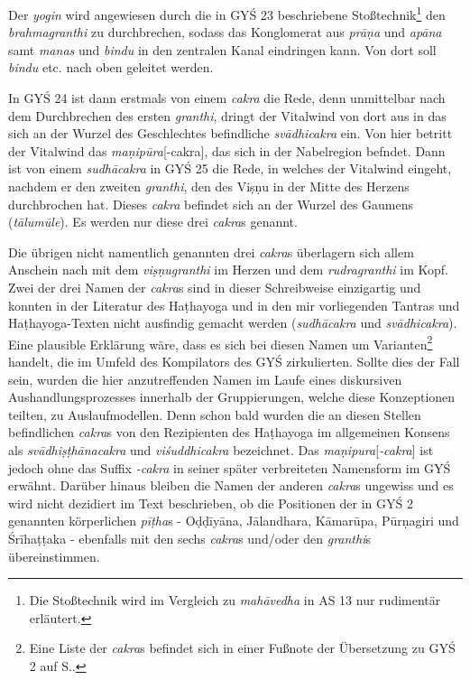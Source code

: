 \documentclass[a4paper,12pt]{article}
\begin{document}
Der \textit{yogin} wird angewiesen durch die in GYŚ 23 beschriebene Stoßtechnik\footnote{Die Stoßtechnik wird im Vergleich zu \textit{mahāvedha} in AS 13 nur rudimentär erläutert.} den \textit{brahmagranthi} zu durchbrechen, sodass das Konglomerat aus \textit{prāṇa} und \textit{apāna} samt \textit{manas} und \textit{bindu} in den zentralen Kanal eindringen kann. Von dort soll \textit{bindu} etc. nach oben geleitet werden.

In GYŚ 24 ist dann erstmals von einem \textit{cakra} die Rede, denn unmittelbar nach dem Durchbrechen des ersten \textit{granthi}, dringt der Vitalwind von dort aus in das sich an der Wurzel des Geschlechtes befindliche \textit{svādhicakra} ein. Von hier betritt der Vitalwind das \textit{maṇipūra}[-cakra], das sich in der Nabelregion befndet. Dann ist von einem \textit{sudhācakra} in GYŚ 25 die Rede, in welches der Vitalwind eingeht, nachdem er den zweiten \textit{granthi}, den des Viṣṇu in der Mitte des Herzens durchbrochen hat. Dieses \textit{cakra} befindet sich an der Wurzel des Gaumens (\textit{tālumūle}). Es werden nur diese drei \textit{cakra}s genannt.

Die übrigen nicht namentlich genannten drei \textit{cakra}s überlagern sich allem Anschein nach mit dem \textit{viṣṇugranthi} im Herzen und dem \textit{rudragranthi} im Kopf. Zwei der drei Namen der \textit{cakra}s sind in dieser Schreibweise einzigartig und konnten in der Literatur des Haṭhayoga und in den mir vorliegenden Tantras und Haṭhayoga-Texten nicht ausfindig gemacht werden (\textit{sudhācakra} und \textit{svādhicakra}). Eine plausible Erklärung wäre, dass es sich bei diesen Namen um Varianten\footnote{Eine Liste der \textit{cakra}s befindet sich in einer Fußnote der Übersetzung zu GYŚ 2 auf S.\pageref{cakras}.} handelt, die im Umfeld des Kompilators des GYŚ zirkulierten. Sollte dies der Fall sein, wurden die hier anzutreffenden Namen im Laufe eines diskursiven Aushandlungsprozesses innerhalb der Gruppierungen, welche diese Konzeptionen teilten, zu Auslaufmodellen. Denn schon bald wurden die an diesen Stellen befindlichen \textit{cakra}s von den Rezipienten des Haṭhayoga im allgemeinen Konsens als \textit{svādhiṣṭhānacakra} und \textit{viśuddhicakra} bezeichnet. Das \textit{maṇipura}[\textit{-cakra}] ist jedoch ohne das Suffix \textit{-cakra} in seiner später verbreiteten Namensform im GYŚ erwähnt. Darüber hinaus bleiben die Namen der anderen \textit{cakra}s ungewiss und es wird nicht dezidiert im Text beschrieben, ob die Positionen der in GYŚ 2 genannten körperlichen \textit{pīṭha}s - Oḍḍīyāna, Jālandhara, Kāmarūpa, Pūrṇagiri und Śrīhaṭṭaka - ebenfalls mit den sechs \textit{cakra}s und/oder den \textit{granthi}s übereinstimmen.
\end{document}
